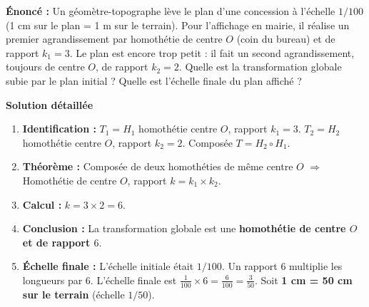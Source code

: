\documentclass[11pt]{article}
\begin{document}
\begin{exoresolu}
\textbf{Énoncé :} Un géomètre-topographe lève le plan d'une concession à l'échelle $1/100$ (1 cm sur le plan = 1 m sur le terrain). Pour l'affichage en mairie, il réalise un premier agrandissement par homothétie de centre $O$ (coin du bureau) et de rapport $k_1 = 3$. Le plan est encore trop petit : il fait un second agrandissement, toujours de centre $O$, de rapport $k_2 = 2$. Quelle est la transformation globale subie par le plan initial ? Quelle est l'échelle finale du plan affiché ?

\textbf{Solution détaillée}
\begin{enumerate}
    \item \textbf{Identification :} $T_1 = H_1$ homothétie centre $O$, rapport $k_1=3$. $T_2 = H_2$ homothétie centre $O$, rapport $k_2=2$. Composée $T = H_2 \circ H_1$.
    \item \textbf{Théorème :} Composée de deux homothéties de même centre $O$ $\Rightarrow$ Homothétie de centre $O$, rapport $k = k_1 \times k_2$.
    \item \textbf{Calcul :} $k = 3 \times 2 = 6$.
    \item \textbf{Conclusion :} La transformation globale est une \textbf{homothétie de centre $O$ et de rapport $6$}.
    \item \textbf{Échelle finale :} L'échelle initiale était $1/100$. Un rapport $6$ multiplie les longueurs par $6$. L'échelle finale est $\frac{1}{100} \times 6 = \frac{6}{100} = \frac{3}{50}$. Soit \textbf{1 cm = 50 cm sur le terrain} (échelle $1/50$).
\end{enumerate}
\end{exoresolu}
\end{document}
